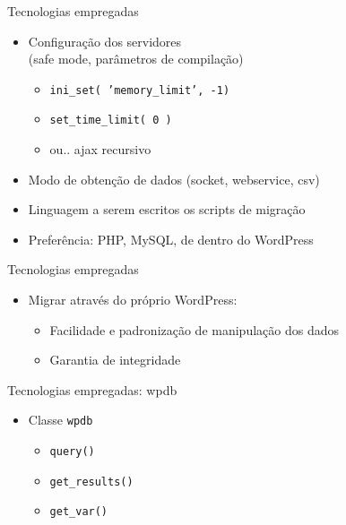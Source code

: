 \documentclass[handout]{beamer}
\begin{document}
\begin{frame}{Tecnologias empregadas}
  \begin{itemize}
    \pause \item Configuração dos servidores\pause \\
                 (safe mode, parâmetros de compilação)
    \begin{itemize}
      \pause \item \texttt{ini\_set( 'memory\_limit', -1)}
      \pause \item \texttt{set\_time\_limit( 0 )}
      \pause \item ou.. \pause ajax recursivo
    \end{itemize}
    \pause \item Modo de obtenção de dados (socket, webservice, csv)
    \pause \item Linguagem a serem escritos os scripts de migração
    \pause \item Preferência: \pause PHP\pause, MySQL\pause, de dentro
                 do WordPress
  \end{itemize}
\end{frame}

\begin{frame}{Tecnologias empregadas}
  \begin{itemize}
    \pause \item Migrar através do próprio WordPress:
    \begin{itemize}
      \pause \item Facilidade e padronização de manipulação dos dados
      \pause \item Garantia de integridade
    \end{itemize}
  \end{itemize}
\end{frame}

\begin{frame}{Tecnologias empregadas: wpdb}
  \begin{itemize}
    \pause \item Classe \texttt{wpdb}
    \begin{itemize}
      \pause \item \texttt{query()}
      \pause \item \texttt{get\_results()}
      \pause \item \texttt{get\_var()}
    \end{itemize}
  \end{itemize}
\end{frame}
\end{document}
